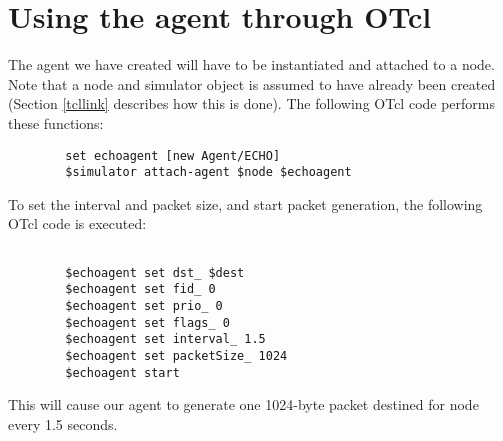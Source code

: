 \section{Using the agent through OTcl}

The agent we have created will have to be instantiated and attached
to a node.
Note that a node and simulator object is assumed to have
already been
created (Section \ref{tcllink} describes how this is done).
The following OTcl code performs these functions:
\begin{small}
\begin{verbatim}
        set echoagent [new Agent/ECHO]
        $simulator attach-agent $node $echoagent
\end{verbatim}
\end{small}

To set the interval and packet size, and start packet generation,
the following OTcl code is executed:
\begin{small}
\begin{verbatim}

        $echoagent set dst_ $dest
        $echoagent set fid_ 0
        $echoagent set prio_ 0
        $echoagent set flags_ 0
        $echoagent set interval_ 1.5
        $echoagent set packetSize_ 1024
        $echoagent start
\end{verbatim}
\end{small}

This will cause our agent to generate one 1024-byte packet destined for
node  every 1.5 seconds.

\endinput
